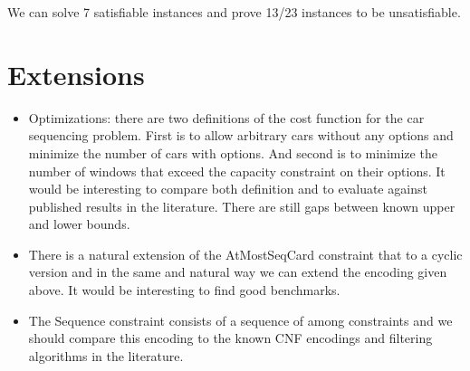 \documentclass[]{llncs}
\begin{document}
We can solve 7 satisfiable instances and prove 13/23 instances to be
unsatisfiable. 


\section{Extensions}

\begin{itemize}
    \item Optimizations: there are two definitions of the cost function
        for the car sequencing problem. First is to allow arbitrary cars
        without any options and minimize the number of cars with
        options. And second is to minimize the number of windows that
        exceed the capacity constraint on their options. It would be
        interesting to compare both definition and to evaluate against
        published results in the literature. There are still gaps
        between known upper and lower bounds. 
    \item There is a natural extension of the AtMostSeqCard constraint
        that to a cyclic version and in the same and natural way we can
        extend the encoding given above. It would be interesting to find
        good benchmarks. 
    \item The Sequence constraint consists of a sequence of among
        constraints and we should compare this encoding to the known CNF
        encodings and filtering algorithms in the literature. 
\end{itemize}




\end{document}
